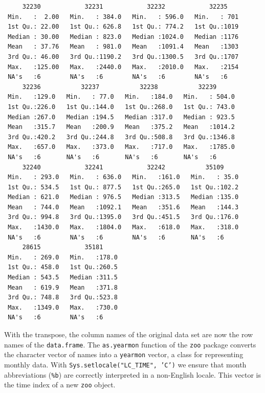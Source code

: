 \begin{verbatim}
     32230            32231            32232            32235     
 Min.   :  2.00   Min.   : 384.0   Min.   : 596.0   Min.   : 701  
 1st Qu.: 22.00   1st Qu.: 626.8   1st Qu.: 774.2   1st Qu.:1019  
 Median : 30.00   Median : 823.0   Median :1024.0   Median :1176  
 Mean   : 37.76   Mean   : 981.0   Mean   :1091.4   Mean   :1303  
 3rd Qu.: 46.00   3rd Qu.:1190.2   3rd Qu.:1300.5   3rd Qu.:1707  
 Max.   :125.00   Max.   :2440.0   Max.   :2010.0   Max.   :2154  
 NA's   :6        NA's   :6        NA's   :6        NA's   :6     
     32236           32237           32238           32239       
 Min.   :129.0   Min.   : 77.0   Min.   :184.0   Min.   : 504.0  
 1st Qu.:226.0   1st Qu.:144.0   1st Qu.:268.0   1st Qu.: 743.0  
 Median :267.0   Median :194.5   Median :317.0   Median : 923.5  
 Mean   :315.7   Mean   :200.9   Mean   :375.2   Mean   :1014.2  
 3rd Qu.:420.2   3rd Qu.:244.8   3rd Qu.:508.8   3rd Qu.:1346.8  
 Max.   :657.0   Max.   :373.0   Max.   :717.0   Max.   :1785.0  
 NA's   :6       NA's   :6       NA's   :6       NA's   :6       
     32240            32241            32242           35109      
 Min.   : 293.0   Min.   : 636.0   Min.   :161.0   Min.   : 35.0  
 1st Qu.: 534.5   1st Qu.: 877.5   1st Qu.:265.0   1st Qu.:102.2  
 Median : 621.0   Median : 976.5   Median :313.5   Median :135.0  
 Mean   : 744.0   Mean   :1092.1   Mean   :351.6   Mean   :144.3  
 3rd Qu.: 994.8   3rd Qu.:1395.0   3rd Qu.:451.5   3rd Qu.:176.0  
 Max.   :1430.0   Max.   :1804.0   Max.   :618.0   Max.   :318.0  
 NA's   :6        NA's   :6        NA's   :6       NA's   :6      
     28615            35181      
 Min.   : 269.0   Min.   :178.0  
 1st Qu.: 458.0   1st Qu.:260.5  
 Median : 543.5   Median :311.5  
 Mean   : 619.9   Mean   :371.8  
 3rd Qu.: 748.8   3rd Qu.:523.8  
 Max.   :1349.0   Max.   :730.0  
 NA's   :6        NA's   :6
\end{verbatim}

With the transpose, the column names of the original data set are
now the row names of the \texttt{data.frame}. The \texttt{as.yearmon} function
of the \texttt{zoo} package converts the character vector of names into a
\texttt{yearmon} vector, a class for representing monthly data. With
\texttt{Sys.setlocale("LC\_TIME", 'C')} we ensure that month abbreviations
(\texttt{\%b}) are correctly interpreted in a non-English locale. This
vector is the time index of a new \texttt{zoo} object. 


